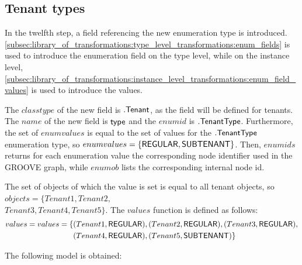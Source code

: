 \subsection{Tenant types}
\label{sec:application:building_the_model:tenant_types}

In the twelfth step, a field referencing the new enumeration type is introduced. \cref{subsec:library_of_transformations:type_level_transformations:enum_fields} is used to introduce the enumeration field on the type level, while on the instance level, \cref{subsec:library_of_transformations:instance_level_transformations:enum_field_values} is used to introduce the values.

The $classtype$ of the new field is $.\mathsf{Tenant}$, as the field will be defined for tenants. The $name$ of the new field is $\mathsf{type}$ and the $enumid$ is $.\mathsf{TenantType}$. Furthermore, the set of $enumvalues$ is equal to the set of values for the $.\mathsf{TenantType}$ enumeration type, so $enumvalues = \{\mathsf{REGULAR}, \mathsf{SUBTENANT}\}$. Then, $enumids$ returns for each enumeration value the corresponding node identifier used in the GROOVE graph, while $enumob$ lists the corresponding internal node id.

The set of objects of which the value is set is equal to all tenant objects, so $objects = \{Tenant1, Tenant2,$\\$ Tenant3, Tenant4, Tenant5\}$. The $values$ function is defined as follows:
\begin{align*}
    values = values = \{&(Tenant1, \mathsf{REGULAR}), (Tenant2, \mathsf{REGULAR}), (Tenant3, \mathsf{REGULAR}), \\&(Tenant4, \mathsf{REGULAR}), (Tenant5, \mathsf{SUBTENANT})\}
\end{align*}

The following model is obtained:


